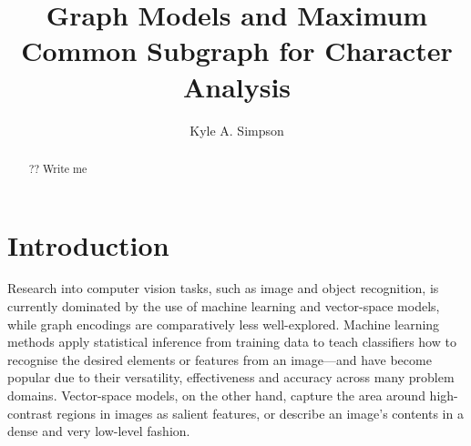 \documentclass{mpaper}
\begin{document}
\title{Graph Models and Maximum Common Subgraph for Character Analysis}
\author{Kyle A. Simpson}

\maketitle
\begin{abstract}
\lipsum[1]

?? Write me
\end{abstract}

\section{Introduction}
\label{sec:introduction}

Research into computer vision tasks, such as image and object recognition, is currently dominated by the use of machine learning and vector-space models, while graph encodings are comparatively less well-explored.
Machine learning methods apply statistical inference from training data to teach classifiers how to recognise the desired elements or features from an image---and have become popular due to their versatility, effectiveness and accuracy across many problem domains.
Vector-space models, on the other hand, capture the area around high-contrast regions in images as salient features, or describe an image's contents in a dense and very low-level fashion.
\end{document}
